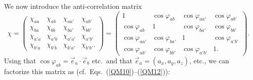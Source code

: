 We now introduce the anti-correlation matrix
\begin{equation}
\chi=
\begin{pmatrix}
\chi_{aa} & \chi_{ab} & \chi_{aa'} & \chi_{ab'} \\[.2cm]
\chi_{ba} & \chi_{bb} & \chi_{ba'} & \chi_{bb'} \\[.2cm]
\chi_{a'a} & \chi_{a'b} & \chi_{a'a'} & \chi_{a'b'} \\[.2cm]
\chi_{b'a} & \chi_{b'b} & \chi_{b'a'} & \chi_{b'b'}.
\end{pmatrix}=
\begin{pmatrix}
1 & \cos \varphi_{ab} & \cos \varphi_{aa'} & \cos \varphi_{ab'} \\[.2cm]
\cos \varphi_{ab} & 1 & \cos \varphi_{ba'} & \cos \varphi_{bb'} \\[.2cm]
\cos \varphi_{aa'} &\cos \varphi_{ba'} & 1 & \cos \varphi_{a'b'} \\[.2cm]
\cos \varphi_{ab'} & \cos \varphi_{bb'} & \cos \varphi_{a'b'} & 1.
\end{pmatrix}.
\label{CHSH-matrix}
\end{equation}
Using that $\cos{\varphi_{ab}} = \vec{e}_a \cdot \vec{e}_b$ etc.\ and that $\vec{e}_a = (a_x, a_y, a_z)$, etc., we can factorize this matrix as (cf.\ Eqs.\ (\ref{QM10})--(\ref{QM12})):
